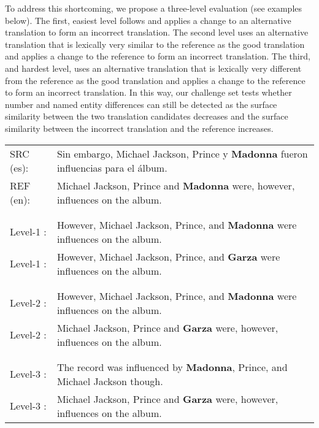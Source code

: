 \documentclass[11pt]{article}
\newcommand{\cmark}{\textcolor{darkpastelgreen}{\ding{51}}}\newcommand{\xmark}{\textcolor{darkpastelred}{\ding{55}}}
\begin{document}
To address this shortcoming, we propose a three-level evaluation (see examples below). The first, easiest level follows \citet{freitag-etal-2021-results} and applies a change to an alternative translation to form an incorrect translation. The second level uses an alternative translation that is lexically very similar to the reference as the good translation and applies a change to the reference to form an incorrect translation. The third, and hardest level, uses an alternative translation that is lexically very different from the reference as the good translation and applies a change to the reference to form an incorrect translation. In this way, our challenge set tests whether number and named entity differences can still be detected as the surface similarity between the two translation candidates decreases and the surface similarity between the incorrect translation and the reference increases.

\begin{small}
\vspace{0.5cm}
\begin{tabularx}{0.95\columnwidth}{lX}
     SRC (es): & Sin embargo, Michael Jackson, Prince y \textbf{Madonna} fueron influencias para el álbum. \\
     REF (en): & Michael Jackson, Prince and \textbf{Madonna} were, however, influences on the album. \\\\\hline\\
    Level-1 \cmark: & However, Michael Jackson, Prince, and \textbf{Madonna} were influences on the album. \\
    Level-1 \xmark: & However, Michael Jackson, Prince, and \textbf{Garza} were influences on the album. \\\\\hline\\
    Level-2 \cmark: & However, Michael Jackson, Prince, and \textbf{Madonna} were influences on the album. \\
    Level-2 \xmark: &  Michael Jackson, Prince and \textbf{Garza} were, however, influences on the album.\\\\\hline\\
    Level-3 \cmark: & The record was influenced by \textbf{Madonna}, Prince, and Michael Jackson  though. \\
    Level-3 \xmark: & Michael Jackson, Prince and \textbf{Garza} were, however, influences on the album.\vspace{0.35cm}
\end{tabularx}
\end{small}
\end{document}
